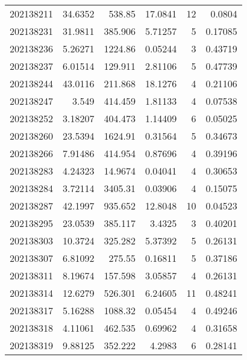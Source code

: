 \begin{tabular}{rrrrrr}
 202138211 &         34.6352  &      538.85   &           17.0841  &          12 & 0.0804  \\
 202138231 &         31.9811  &      385.906  &            5.71257 &           5 & 0.17085 \\
 202138236 &          5.26271 &     1224.86   &            0.05244 &           3 & 0.43719 \\
 202138237 &          6.01514 &      129.911  &            2.81106 &           5 & 0.47739 \\
 202138244 &         43.0116  &      211.868  &           18.1276  &           4 & 0.21106 \\
 202138247 &          3.549   &      414.459  &            1.81133 &           4 & 0.07538 \\
 202138252 &          3.18207 &      404.473  &            1.14409 &           6 & 0.05025 \\
 202138260 &         23.5394  &     1624.91   &            0.31564 &           5 & 0.34673 \\
 202138266 &          7.91486 &      414.954  &            0.87696 &           4 & 0.39196 \\
 202138283 &          4.24323 &       14.9674 &            0.04041 &           4 & 0.30653 \\
 202138284 &          3.72114 &     3405.31   &            0.03906 &           4 & 0.15075 \\
 202138287 &         42.1997  &      935.652  &           12.8048  &          10 & 0.04523 \\
 202138295 &         23.0539  &      385.117  &            3.4325  &           3 & 0.40201 \\
 202138303 &         10.3724  &      325.282  &            5.37392 &           5 & 0.26131 \\
 202138307 &          6.81092 &      275.55   &            0.16811 &           5 & 0.37186 \\
 202138311 &          8.19674 &      157.598  &            3.05857 &           4 & 0.26131 \\
 202138314 &         12.6279  &      526.301  &            6.24605 &          11 & 0.48241 \\
 202138317 &          5.16288 &     1088.32   &            0.05454 &           4 & 0.49246 \\
 202138318 &          4.11061 &      462.535  &            0.69962 &           4 & 0.31658 \\
 202138319 &          9.88125 &      352.222  &            4.2983  &           6 & 0.28141 \\

\end{tabular}
